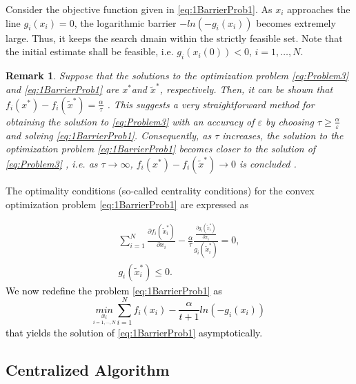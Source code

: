 \documentclass[letterpaper, 10 pt, conference]{ieeeconf}  %
\newtheorem{remark}[theorem]{Remark}
\begin{document}
{Consider the objective function given in \eqref{eq:1BarrierProb1}.
As $x_{i}$ approaches the line $g_{i}(x_{i})=0$, the logarithmic
barrier $-ln\left(-g_{i}(x_{i})\right)$ becomes extremely large.
Thus, it keeps the search dmain within the strictly feasible set.
Note that the initial estimate shall be feasible, i.e. $g_{i}\left(x_{i}(0)\right)<0$,
$i=1,\ldots,N$.
\begin{remark}
	\label{rem:barriermethod}Suppose that the solutions to the optimization
	problem \eqref{eq:Problem3} and \eqref{eq:1BarrierProb1} are $x^{*}$and
	$\widetilde{x}^{*}$, respectively. Then, it can be shown that $f_{i}(x^{*})-f_{i}(\widetilde{x}^{*})=\frac{\alpha}{\tau}$
	\cite{boyd2004convex,wang2011control}. This suggests a very straightforward
	method for obtaining the solution to \eqref{eq:Problem3} with an
	accuracy of $\varepsilon$ by choosing $\tau\geq\frac{\alpha}{\varepsilon}$
	and solving \eqref{eq:1BarrierProb1}. Consequently, as $\tau$ increases,
	the solution to the optimization problem \eqref{eq:1BarrierProb1}
	becomes closer to the solution of \eqref{eq:Problem3} , i.e. as $\tau\rightarrow\infty$,
	$f_{i}(x^{*})-f_{i}(\widetilde{x}^{*})\rightarrow0$ is concluded
	\cite[pp. 568-571]{boyd2004convex}.
\end{remark}


The optimality conditions (so-called centrality conditions) for the convex
optimization problem \eqref{eq:1BarrierProb1} are expressed as \cite{boyd2004convex}

\begin{equation}
\begin{array}{c}
{\displaystyle \sum_{i=1}^{N}\frac{\partial f_{i}(\tilde{x}_{i}^{*})}{\partial x_{i}}}-{\displaystyle \frac{\alpha}{\tau}\frac{{\scriptstyle {\displaystyle {\displaystyle \frac{\partial g_{i}(\tilde{x}_{i}^{*})}{\partial x_{i}}}}}}{g_{i}(\tilde{x}_{i}^{*})}}=0,\\
g_{i}(\tilde{x}_{i}^{*})\leq0.
\end{array}\label{eq:1OptCondition}
\end{equation}
\textcolor{black}{ We now redefine the problem \eqref{eq:1BarrierProb1}
	as
	\begin{equation}
	\underset{\underset{i=1,\cdots,N}{x_{i}}}{min}\sum_{i=1}^{N}f_{i}(x_{i})-{\displaystyle \frac{\alpha}{t+1}}ln\left(-g_{i}(x_{i})\right)\label{eq:1BarrierProb2}
	\end{equation}
	that yields the solution of \eqref{eq:1BarrierProb1} asymptotically.}


\subsection{Centralized Algorithm}

}
\end{document}
